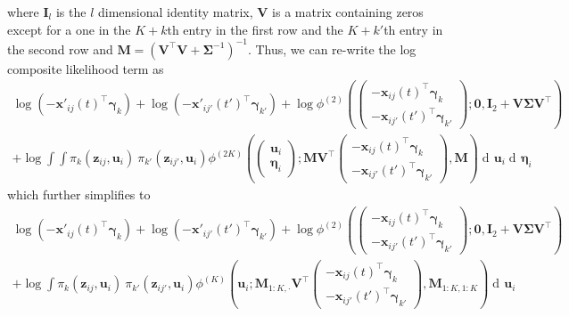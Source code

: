 \documentclass{article}
\newcommand\mat[1]{\mathbf{#1}}
\renewcommand\vec{\bm}
\newcommand\der{\operatorname{d\!}{}}
\begin{document}
%
where $\mat I_l$ is the $l$ dimensional identity matrix,
$\mat V$ is a matrix containing zeros except for a one in 
the $K + k$th entry in the 
first row and the $K + k'$th entry in the second row and 
$\mat M = (\mat V^\top\mat V + \mat\Sigma^{-1})^{-1}$. Thus, we can re-write the 
log composite likelihood term as%
%
%
\begin{multline*}
\log(-\vec x'_{ij}(t)^\top\vec\gamma_k) + \log(-\vec x'_{ij'}(t')^\top\vec\gamma_{k'})
  +\log\phi^{(2)}\left(
  \begin{pmatrix}
    -\vec x_{ij}(t)^\top\vec\gamma_k \\
    -\vec x_{ij'}(t')^\top\vec\gamma_{k'} 
  \end{pmatrix}; \vec 0 ,
  \mat I_2 + \mat V\mat\Sigma\mat V^\top
  \right) \\ 
+ \log\int\int 
    \pi_k(\vec z_{ij},\vec u_i)\
    \pi_{k'}(\vec z_{ij'},\vec u_i)
    \phi^{(2K)}\left(
    \begin{pmatrix}\vec u_i \\ \vec\eta_i \end{pmatrix}; 
    \mat M\mat V^\top\begin{pmatrix}
      -\vec x_{ij}(t)^\top\vec\gamma_k \\
      -\vec x_{ij'}(t')^\top\vec\gamma_{k'} 
    \end{pmatrix},
    \mat M
    \right)
    \der \vec u_i\der \vec\eta_i
\end{multline*}%
%
which further simplifies to %
%
\begin{multline*}
\log(-\vec x'_{ij}(t)^\top\vec\gamma_k) + \log(-\vec x'_{ij'}(t')^\top\vec\gamma_{k'})
  +\log\phi^{(2)}\left(
  \begin{pmatrix}
    -\vec x_{ij}(t)^\top\vec\gamma_k \\
    -\vec x_{ij'}(t')^\top\vec\gamma_{k'} 
  \end{pmatrix}; \vec 0 ,
  \mat I_2 + \mat V\mat\Sigma\mat V^\top
  \right) \\ 
+ \log\int
    \pi_k(\vec z_{ij},\vec u_i)\
    \pi_{k'}(\vec z_{ij'},\vec u_i)
    \phi^{(K)}\left(
    \vec u_i; 
    \mat M_{1:K,\cdot}\mat V^\top\begin{pmatrix}
      -\vec x_{ij}(t)^\top\vec\gamma_k \\
      -\vec x_{ij'}(t')^\top\vec\gamma_{k'} 
    \end{pmatrix},
    \mat M_{1:K,1:K}
    \right)
    \der \vec u_i
\end{multline*}
\end{document}
